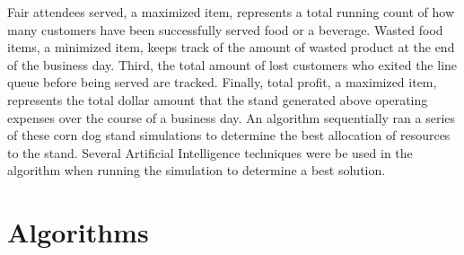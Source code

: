\documentclass[10pt, twocolumn]{article}
\begin{document}
Fair attendees served,
a maximized item, represents a total running count of how many customers have been successfully
served food or a beverage. Wasted food items, a minimized item, keeps track of the
amount of wasted product at the end of the business day. Third, the total amount of lost
customers who exited the line queue before being served are tracked. Finally, total
profit, a maximized item, represents the total dollar amount that the
stand generated above operating expenses over the course of a business day.
An algorithm sequentially ran a series of these corn dog stand simulations
to determine the best allocation of resources to the stand. Several Artificial
Intelligence techniques were be used in the algorithm when running the simulation
to determine a best solution.

\section{Algorithms}
\end{document}
